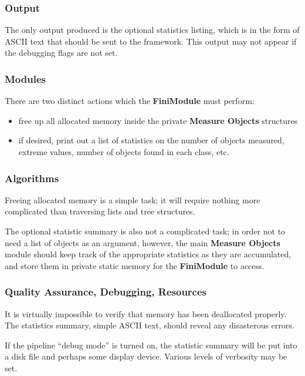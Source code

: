 \subsubsection {Output}

  The only output produced is the optional statistics
listing, which is in the form of ASCII text that should
be sent to the framework.  This output may not appear
if the debugging flags are not set.

\subsubsection {Modules}

  There are two distinct actions which the {\bf FiniModule}
must perform:

\begin {itemize}
    \item free up all allocated memory inside the private
          {\bf Measure Objects} structures
    \item if desired, print out a list of statistics on the
          number of objects measured, extreme values, 
          number of objects found in each class, etc.
\end {itemize}

\subsubsection {Algorithms}

  Freeing allocated memory is a simple task; it will require
nothing more complicated than traversing lists and tree
structures.

  The optional statistic summary is also not a complicated
task; in order not to need a list of objects as an argument,
however, the main {\bf Measure Objects} module should
keep track of the appropriate statistics as they are
accumulated, and store them in private static memory
for the {\bf FiniModule} to access.

\subsubsection {Quality Assurance, Debugging, Resources}

  It is virtually impossible to verify that memory has
been deallocated properly.  The statistics summary, 
simple ASCII text, should reveal any disasterous
errors.

  If the pipeline ``debug mode'' is turned on, the
statistic summary will be put into a disk file and
perhaps some display device.  Various levels of
verbosity may be set.

